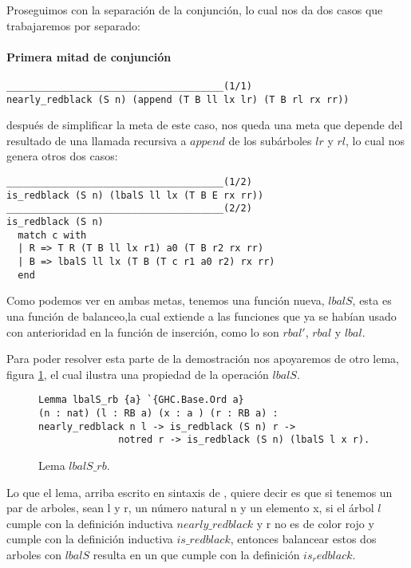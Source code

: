 Proseguimos con la separaci\'on de la conjunci\'on, lo cual nos da dos casos que trabajaremos por
separado:

\paragraph{Primera mitad de conjunci\'on}

\begin{verbatim}
______________________________________(1/1)
nearly_redblack (S n) (append (T B ll lx lr) (T B rl rx rr))
\end{verbatim}

después de simplificar la meta de este caso, nos queda una meta que depende del resultado de una
llamada recursiva a $append$ de los subárboles $lr$ y $rl$, lo cual nos genera otros dos casos:

\begin{verbatim}
______________________________________(1/2)
is_redblack (S n) (lbalS ll lx (T B E rx rr))
______________________________________(2/2)
is_redblack (S n)
  match c with
  | R => T R (T B ll lx r1) a0 (T B r2 rx rr)
  | B => lbalS ll lx (T B (T c r1 a0 r2) rx rr)
  end
\end{verbatim}

Como podemos ver en ambas metas, tenemos una funci\'on nueva, $lbalS$, esta es una funci\'on de
balanceo,la cual extiende a las funciones que ya se habían usado con anterioridad en la funci\'on
de inserci\'on, como lo son $rbal'$, $rbal$ y $lbal$.

Para poder resolver esta parte de la demostraci\'on nos apoyaremos de otro lema, figura
\ref{lema_5}, el cual ilustra una propiedad de la operaci\'on $lbalS$.

\begin{figure}[!ht]
\centering
\captionsetup{justification=centering}
\begin{verbatim}
Lemma lbalS_rb {a} `{GHC.Base.Ord a}
(n : nat) (l : RB a) (x : a ) (r : RB a) :
nearly_redblack n l -> is_redblack (S n) r ->
              notred r -> is_redblack (S n) (lbalS l x r).
\end{verbatim}
\caption{Lema $lbalS\_rb$.}
\label{lema_5}
\end{figure}


Lo que el lema, arriba escrito en sintaxis de {\coq}, quiere decir es que si tenemos un par de
arboles, sean l y r, un n\'umero natural n y un elemento x, si el \'arbol $l$ cumple con la
definici\'on inductiva $nearly\_redblack$ y r no es de color rojo y cumple con la definici\'on
inductiva $is\_redblack$, entonces balancear estos dos arboles con $lbalS$ resulta en un {\arn}
que cumple con la definici\'on $is_redblack$.

